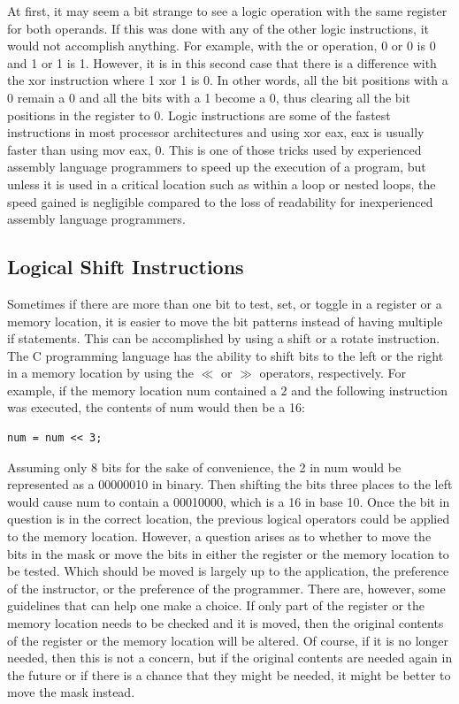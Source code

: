 \documentclass[10pt]{book}
\begin{document}
At first, it may seem a bit strange to see a logic operation with the same register for both operands. If this was done with any of the other logic instructions, it would not accomplish anything. For example, with the or operation, 0 or 0 is 0 and 1 or 1 is 1. However, it is in this second case that there is a difference with the xor instruction where 1 xor 1 is 0. In other words, all the bit positions with a 0 remain a 0 and all the bits with a 1 become a 0, thus clearing all the bit positions in the register to 0. Logic instructions are some of the fastest instructions in most processor architectures and using xor eax, eax is usually faster than using mov eax, 0. This is one of those tricks used by experienced assembly language programmers to speed up the execution of a program, but unless it is used in a critical location such as within a loop or nested loops, the speed gained is negligible compared to the loss of readability for inexperienced assembly language programmers.

\subsection{Logical Shift Instructions}
Sometimes if there are more than one bit to test, set, or toggle in a register or a memory location, it is easier to move the bit patterns instead of having multiple if statements. This can be accomplished by using a shift or a rotate instruction. The C programming language has the ability to shift bits to the left or the right in a memory location by using the $\ll$ or $\gg$ operators, respectively. For example, if the memory location num contained a 2 and the following instruction was executed, the contents of num would then be a 16:

\begin{verbatim}
num = num << 3;
\end{verbatim}

Assuming only 8 bits for the sake of convenience, the 2 in num would be represented as a 00000010 in binary. Then shifting the bits three places to the left would cause num to contain a 00010000, which is a 16 in base 10. Once the bit in question is in the correct location, the previous logical operators could be applied to the memory location.
However, a question arises as to whether to move the bits in the mask or move the bits in either the register or the memory location to be tested. Which should be moved is largely up to the application, the preference of the instructor, or the preference of the programmer. There are, however, some guidelines that can help one make a choice. If only part of the register or the memory location needs to be checked and it is moved, then the original contents of the register or the memory location will be altered. Of course, if it is no longer needed, then this is not a concern, but if the original contents are needed again in the future or if there is a chance that they might be needed, it might be better to move the mask instead.
\end{document}
